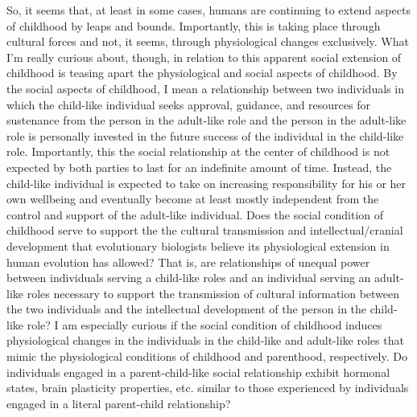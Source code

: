 So, it seems that, at least in some cases, humans are continuing to extend aspects of childhood by leaps and bounds.
Importantly, this is taking place through cultural forces and not, it seems, through physiological changes exclusively.
What I'm really curious about, though, in relation to this apparent social extension of childhood is teasing apart the physiological and social aspects of childhood.
By the social aspects of childhood, I mean a relationship between two individuals in which the child-like individual seeks approval, guidance, and resources for sustenance from the person in the adult-like role and the person in the adult-like role is personally invested in the future success of the individual in the child-like role.
Importantly, this the social relationship at the center of childhood is not expected by both parties to last for an indefinite amount of time.
Instead, the child-like individual is expected to take on increasing responsibility for his or her own wellbeing and eventually become at least mostly independent from the control and support of the adult-like individual.
Does the social condition of childhood serve to support the the cultural transmission and intellectual/cranial development that evolutionary biologists believe its physiological extension in human evolution has allowed?
That is, are relationships of unequal power between individuals serving a child-like roles and an individual serving an adult-like roles necessary to support the transmission of cultural information between the two individuals and the intellectual development of the person in the child-like role?
I am especially curious if the social condition of childhood induces physiological changes in the individuals in the child-like and adult-like roles that mimic the physiological conditions of childhood and parenthood, respectively.
Do individuals engaged in a parent-child-like social relationship exhibit hormonal states, brain plasticity properties, etc. similar to those experienced by individuals engaged in a literal parent-child relationship?

